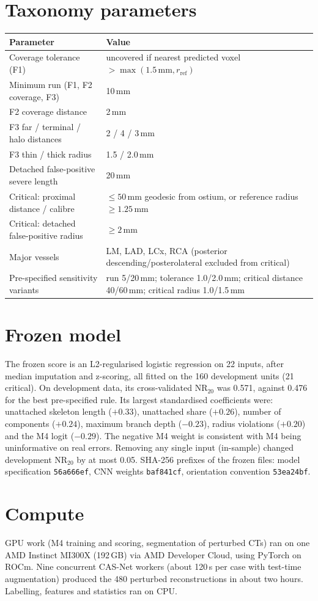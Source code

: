 \documentclass[11pt]{article}
\newcommand{\NR}{\mathrm{NR}_{20}}
\begin{document}
\begin{appendices}
\section{Taxonomy parameters}
\label{app:taxonomy}
\begin{table}[h]
\centering
\small
\begin{tabularx}{\linewidth}{lX}
\toprule
Parameter & Value \\
\midrule
Coverage tolerance (F1) & uncovered if nearest predicted voxel $> \max(1.5\,\mathrm{mm}, r_{\text{ref}})$ \\
Minimum run (F1, F2 coverage, F3) & 10\,mm \\
F2 coverage distance & 2\,mm \\
F3 far / terminal / halo distances & 2 / 4 / 3\,mm \\
F3 thin / thick radius & 1.5 / 2.0\,mm \\
Detached false-positive severe length & 20\,mm \\
Critical: proximal distance / calibre & $\leq 50$\,mm geodesic from ostium, or reference radius $\geq 1.25$\,mm \\
Critical: detached false-positive radius & $\geq 2$\,mm \\
Major vessels & LM, LAD, LCx, RCA (posterior descending/posterolateral excluded from critical) \\
Pre-specified sensitivity variants & run 5/20\,mm; tolerance 1.0/2.0\,mm; critical distance 40/60\,mm; critical radius 1.0/1.5\,mm \\
\bottomrule
\end{tabularx}
\end{table}

\section{Frozen model}
\label{app:model}
The frozen score is an L2-regularised logistic regression on 22 inputs, after median imputation and z-scoring, all fitted on the 160 development units (21 critical). On development data, its cross-validated $\NR$ was 0.571, against 0.476 for the best pre-specified rule. Its largest standardised coefficients were: unattached skeleton length ($+0.33$), unattached share ($+0.26$), number of components ($+0.24$), maximum branch depth ($-0.23$), radius violations ($+0.20$) and the M4 logit ($-0.29$). The negative M4 weight is consistent with M4 being uninformative on real errors. Removing any single input (in-sample) changed development $\NR$ by at most 0.05. SHA-256 prefixes of the frozen files: model specification \texttt{56a666ef}, CNN weights \texttt{baf841cf}, orientation convention \texttt{53ea24bf}.

\section{Compute}
GPU work (M4 training and scoring, segmentation of perturbed CTs) ran on one AMD Instinct MI300X (192\,GB) via AMD Developer Cloud, using PyTorch on ROCm. Nine concurrent CAS-Net workers (about 120\,s per case with test-time augmentation) produced the 480 perturbed reconstructions in about two hours. Labelling, features and statistics ran on CPU.
\end{appendices}
\end{document}
